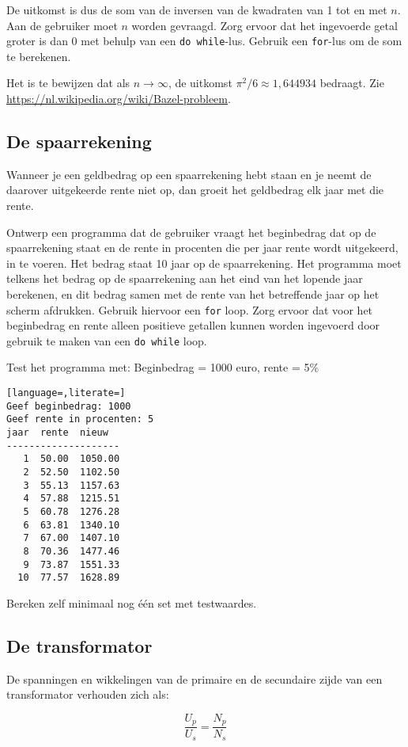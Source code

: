 \documentclass[a4paper,10pt,fleqn,twoside]{article}
\begin{document}
De uitkomst is dus de som van de inversen van de kwadraten van 1 tot en met $n$. Aan de gebruiker moet $n$ worden gevraagd. Zorg ervoor dat het ingevoerde getal groter is dan 0 met behulp van een \lstinline|do while|-lus. Gebruik een \lstinline|for|-lus om de som te berekenen.

Het is te bewijzen dat als $n\longrightarrow\infty$, de uitkomst $\pi^2/6 \approx 1,644934$ bedraagt. Zie \url{https://nl.wikipedia.org/wiki/Bazel-probleem}.

\subsection{De spaarrekening}
Wanneer je een geldbedrag op een spaarrekening hebt staan en je neemt de daarover uitgekeerde rente niet op, dan groeit het geldbedrag elk jaar met die rente. 

Ontwerp een programma dat de gebruiker vraagt het beginbedrag dat op de spaarrekening staat en de rente in procenten die per jaar rente wordt uitgekeerd, in te voeren. Het bedrag staat 10 jaar op de spaarrekening. Het programma moet telkens het bedrag op de spaarrekening aan het eind van het lopende jaar berekenen, en dit bedrag samen met de rente van het betreffende jaar op het scherm afdrukken. Gebruik hiervoor een \lstinline|for| loop. Zorg ervoor dat voor het beginbedrag en rente alleen positieve getallen kunnen worden ingevoerd door gebruik te maken van een \lstinline|do while| loop.

Test het programma met: Beginbedrag = 1000 euro, rente = 5\%

\begin{lstlisting}[language=,literate=]
Geef beginbedrag: 1000
Geef rente in procenten: 5
jaar  rente  nieuw
--------------------
   1  50.00  1050.00
   2  52.50  1102.50
   3  55.13  1157.63
   4  57.88  1215.51
   5  60.78  1276.28
   6  63.81  1340.10
   7  67.00  1407.10
   8  70.36  1477.46
   9  73.87  1551.33
  10  77.57  1628.89
\end{lstlisting}

Bereken zelf minimaal nog één set met testwaardes.

\subsection{De transformator}
De spanningen en wikkelingen van de primaire en de secundaire zijde van een transformator verhouden zich als:

\begin{equation*}
\dfrac{U_p}{U_s} = \dfrac{N_p}{N_s}
\end{equation*}
\end{document}
